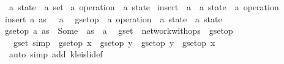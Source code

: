 \begin{isabellebody}%
\isamarkupfalse%
\ {\isacharparenleft}{\isacharprime}a{\isacharparenright}\ state\ {\isacharequal}\ {\isachardoublequoteopen}{\isacharprime}a\ set{\isachardoublequoteclose}\isanewline
{}\isamarkupfalse%
\ {\isacharparenleft}{\isacharprime}a{\isacharparenright}\ operation\ {\isacharequal}\ {\isachardoublequoteopen}{\isacharprime}a\ state{\isachardoublequoteclose}\isanewline
\isanewline
{}\isamarkupfalse%
\ insert\ {\isacharcolon}{\isacharcolon}\ {\isachardoublequoteopen}{\isacharprime}a\ {\isasymRightarrow}\ {\isacharparenleft}{\isacharprime}a\ state{\isacharparenright}\ {\isasymRightarrow}\ {\isacharparenleft}{\isacharprime}a\ operation{\isacharparenright}{\isachardoublequoteclose}\ \isanewline
{\isachardoublequoteopen}insert\ a\ as\ {\isacharequal}\ {\isacharbraceleft}\ a\ {\isacharbraceright}{\isachardoublequoteclose}\isanewline
\isanewline
{}\isamarkupfalse%
\ gset{\isacharunderscore}op\ {\isacharcolon}{\isacharcolon}\ {\isachardoublequoteopen}{\isacharparenleft}{\isacharprime}a\ operation{\isacharparenright}\ {\isasymRightarrow}\ {\isacharparenleft}{\isacharprime}a\ state{\isacharparenright}\ {\isasymrightharpoonup}\ {\isacharparenleft}{\isacharprime}a\ state{\isacharparenright}{\isachardoublequoteclose}\ \isanewline
{\isachardoublequoteopen}gset{\isacharunderscore}op\ a\ as\ {\isacharequal}\ Some\ {\isacharparenleft}\ as\ {\isasymunion}\ a\ {\isacharparenright}{\isachardoublequoteclose}\isanewline
\isanewline
{}\isamarkupfalse%
\ gset\ {\isacharequal}\ network{\isacharunderscore}with{\isacharunderscore}ops\ {\isacharunderscore}\ gset{\isacharunderscore}op\ {\isachardoublequoteopen}{\isacharbraceleft}{\isacharbraceright}{\isachardoublequoteclose}\isanewline
\isanewline
{}\isamarkupfalse%
\ {\isacharparenleft}\ gset{\isacharparenright}\ {\isacharbrackleft}simp{\isacharbrackright}\ {\isacharcolon}\ {\isachardoublequoteopen}gset{\isacharunderscore}op\ x\ {\isasymrhd}\ gset{\isacharunderscore}op\ y\ {\isacharequal}\ gset{\isacharunderscore}op\ y\ {\isasymrhd}\ gset{\isacharunderscore}op\ x{\isachardoublequoteclose}\isanewline
%
\isadelimproof
\ \ %
\endisadelimproof
%
\isatagproof
{}\isamarkupfalse%
\ {\isacharparenleft}auto\ simp\ add{\isacharcolon}\ kleisli{\isacharunderscore}def{\isacharparenright}\isanewline
{}\isamarkupfalse%
%
\endisatagproof
{\isafoldproof}%
%
\isadelimproof
%
\endisadelimproof
\end{isabellebody}
\endinput
